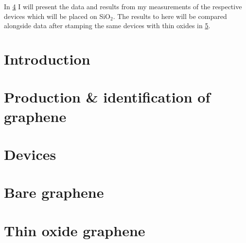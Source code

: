 \documentclass{report}
\begin{document}
	In \cref{chap:baregraphene} I will present the data and results from my measurements of the respective devices which will be placed on SiO$_2$. The results to here will be compared alongside data after stamping the same devices with thin oxides in  \cref{chap:thinoxidegraphene}.
	

	\chapter{Introduction}\label{chap:introduction}
	
	
	\chapter{Production \& identification of graphene}\label{chap:production&identification}
	
	
	\chapter{Devices}\label{chap:fab&characterisation}
	
	
	\chapter{Bare graphene}\label{chap:baregraphene}
	
	
	\chapter{Thin oxide graphene}\label{chap:thinoxidegraphene}
	
	


\end{document}
